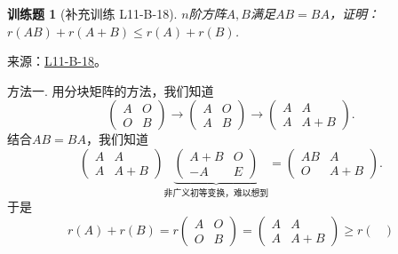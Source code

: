 \documentclass[12pt,fontset=fandol]{ctexart}
\newtheorem{exercise}{训练题}[section]
\begin{document}
\begin{exercise}[补充训练 L11-B-18]\label{prob:L11-B-18}
$n$阶方阵$A,B$满足$AB=BA$，证明：$r(AB)+r(A+B) \leqslant r(A)+r(B)$.
\end{exercise}
\noindent 来源：\href{https://github.com/yhwu-is/Linear-Algebra-Left-Undone/blob/new/%E8%AE%B2%E4%B9%89/%E4%B8%93%E9%A2%98/11%20%E6%9C%9D%E8%8A%B1%E5%A4%95%E6%8B%BE.tex}{L11-B-18}。
\begin{solve}
方法一. 用分块矩阵的方法，我们知道
          \[ \begin{pmatrix}
                  A & O \\
                  O & B
              \end{pmatrix}
              \rightarrow
              \begin{pmatrix}
                  A & O \\
                  A & B
              \end{pmatrix}
              \rightarrow
              \begin{pmatrix}
                  A & A   \\
                  A & A+B
              \end{pmatrix}. \]
          结合$AB=BA$，我们知道
          \[ \begin{pmatrix}
                  A & A   \\
                  A & A+B
              \end{pmatrix}
              \underbrace{
                  \begin{pmatrix}
                      A+B & O \\
                      -A  & E
                  \end{pmatrix}
              }_{\text{非广义初等变换，难以想到}}
              =
              \begin{pmatrix}
                  AB & A   \\
                  O  & A+B
              \end{pmatrix}. \]
          于是
          \[ r(A)+r(B)=r
              \begin{pmatrix}
                  A & O \\
                  O & B
              \end{pmatrix}=
              \begin{pmatrix}
                  A & A   \\
                  A & A+B
              \end{pmatrix}\geqslant r
              \begin{pmatrix}

\end{pmatrix}\]
\end{solve}
\end{document}
